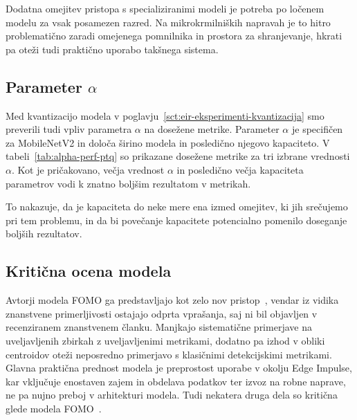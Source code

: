 \documentclass[a4paper,twoside,openright,12pt,slovene]{book}
\begin{document}
            Dodatna omejitev pristopa s specializiranimi modeli je potreba po
            ločenem modelu za vsak posamezen razred. Na mikrokrmilniških
            napravah je to hitro problematično zaradi omejenega pomnilnika in
            prostora za shranjevanje, hkrati pa oteži tudi praktično uporabo
            takšnega sistema.


        \subsection{Parameter $\alpha$}

            Med kvantizacijo modela v
            poglavju~\ref{sct:eir-eksperimenti-kvantizacija}
            smo preverili tudi vpliv
            parametra $\alpha$ na dosežene metrike. Parameter $\alpha$ je
            specifičen za MobileNetV2 in določa širino modela in posledično
            njegovo kapaciteto.
            V tabeli~\ref{tab:alpha-perf-ptq}
            so
            prikazane dosežene metrike za tri izbrane vrednosti $\alpha$. Kot
            je pričakovano, večja vrednost $\alpha$ in posledično večja
            kapaciteta parametrov vodi k znatno boljšim rezultatom v metrikah. 

            To nakazuje, da je kapaciteta do neke mere ena izmed omejitev, ki
            jih srečujemo pri tem problemu, in da bi povečanje kapacitete
            potencialno pomenilo doseganje boljših rezultatov.

        \subsection{Kritična ocena modela} \label{sct:fomo-diskusija-kriticen-pogled}
            
            Avtorji modela FOMO ga predstavljajo kot zelo nov
            pristop~\cite{src:fomodocs}, vendar iz vidika znanstvene
            primerljivosti ostajajo odprta vprašanja, saj ni bil objavljen v
            recenziranem znanstvenem članku. Manjkajo sistematične primerjave
            na uveljavljenih zbirkah z uveljavljenimi metrikami, dodatno pa
            izhod v obliki centroidov oteži neposredno primerjavo s klasičnimi
            detekcijskimi metrikami. Glavna praktična prednost modela je
            preprostost uporabe v okolju Edge Impulse, kar vključuje enostaven
            zajem in obdelava podatkov ter izvoz na robne naprave, ne pa nujno
            preboj v arhitekturi modela. Tudi nekatera druga dela so kritična
            glede modela FOMO~\cite{src:boyle2024dsort}.
            
\end{document}
